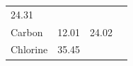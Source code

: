 \begin{enumerate}[noitemsep, label=\textbf{\arabic*}. ]
{\begin{tabular}[t]{|l|l|l|l|}
    
        24.31 &
    
    
     \tabularnewline\cline{1-1}\cline{2-2}\cline{3-3}\cline{4-4}
    
    
        Carbon &
    
    
        12.01 &
    
    
        24.02 &
    
    
     \tabularnewline\cline{1-1}\cline{2-2}\cline{3-3}\cline{4-4}
    
    
        Chlorine &
    
    
        35.45 &
    

\end{tabular}}
\end{enumerate}
